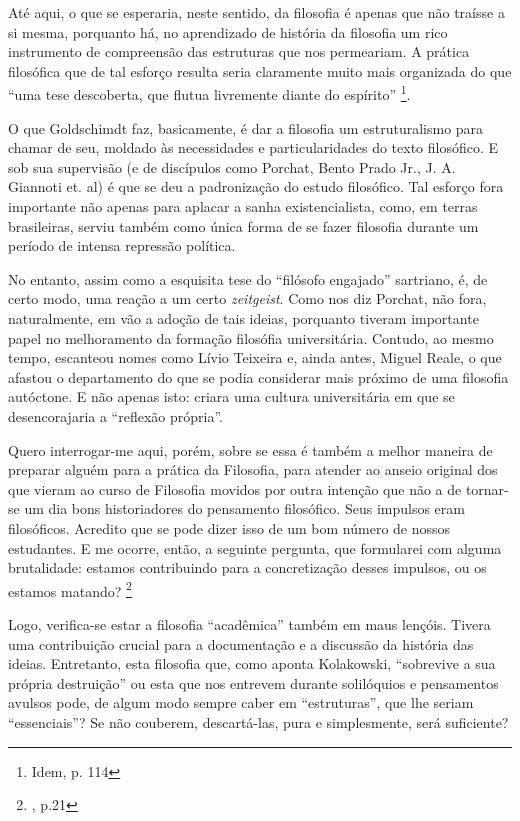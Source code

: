\documentclass[12pt,a4paper]{article}
\newenvironment{citac}{
	\begin{addmargin}[4cm]{1em} \footnotesize}{\normalfont \end{addmargin}
}
\begin{document}
	Até aqui, o que se esperaria, neste sentido, da filosofia é apenas 
	que não traísse a si mesma, porquanto há, no aprendizado de história 
	da filosofia um rico instrumento de compreensão das estruturas que 
	nos permeariam. A prática filosófica que de tal esforço resulta 
	seria claramente muito mais organizada do que “uma tese descoberta, 
	que flutua livremente diante do espírito” \footnote{Idem, p. 114}. 

	O que Goldschimdt faz, basicamente, é dar a filosofia um 
	estruturalismo para chamar de seu, moldado às necessidades e 
	particularidades do texto filosófico. E sob sua supervisão 
	(e de discípulos como Porchat, Bento Prado Jr., J. A. Giannoti
	et. al) é que se deu a padronização do estudo filosófico. Tal 
	esforço fora importante não apenas para aplacar a sanha 
	existencialista, como, em terras brasileiras, serviu também 
	como única forma de se fazer filosofia durante um período de 
	intensa repressão política. 

	No entanto, assim como a esquisita tese do “filósofo engajado” 
	sartriano, é, de certo modo, uma reação a um certo \textit{zeitgeist}. 
	Como nos diz Porchat, não fora, naturalmente, em vão a adoção de tais 
	ideias, porquanto tiveram importante papel no melhoramento da formação 
	filosófia universitária. Contudo, ao mesmo tempo, escanteou nomes 
	como Lívio Teixeira e, ainda antes, Miguel Reale, o que afastou o 
	departamento do que se podia considerar mais próximo de uma filosofia 
	autóctone. E não apenas isto: criara uma cultura universitária em que 
	se desencorajaria a “reflexão própria”. 

	\begin{citac}
		Quero interrogar-me aqui, porém, sobre se essa é também a
		melhor maneira de preparar alguém para a prática da Filosofia, 
		para
		atender ao anseio original dos que vieram ao curso de Filosofia
		movidos por outra intenção que não a de tornar-se um dia bons
		historiadores do pensamento filosófico. Seus impulsos eram 
		filosóficos. Acredito que se pode dizer isso de um bom número 
		de nossos estudantes. E me ocorre, então, a seguinte pergunta, 
		que formularei com alguma brutalidade: estamos contribuindo 
		para a concretização desses impulsos, ou os estamos matando? 
		\footnote{\cite{porchat}, p.21}
	\end{citac}
	
	Logo, verifica-se estar a filosofia “acadêmica” também em maus lençóis. 
	Tivera uma contribuição crucial para a documentação e a discussão da 
	história das ideias. Entretanto, esta filosofia que, como aponta 
	Kolakowski, “sobrevive a sua própria destruição” ou esta que nos 
	entrevem durante solilóquios e pensamentos avulsos pode, de algum modo 
	sempre caber em “estruturas”, que lhe seriam “essenciais”? Se não 
	couberem, descartá-las, pura e simplesmente, será suficiente? 
\end{document}
